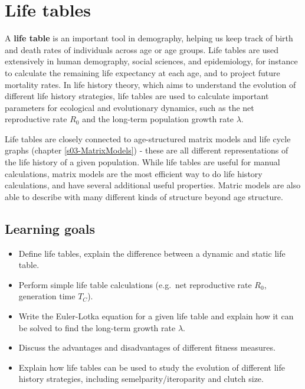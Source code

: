 \documentclass[
]{book}
\begin{document}
\hypertarget{s02-life-tables}{%
\chapter{Life tables}\label{s02-life-tables}}

A \textbf{life table} is an important tool in demography, helping us keep track of birth and death rates of individuals across age or age groups. Life tables are used extensively in human demography, social sciences, and epidemiology, for instance to calculate the remaining life expectancy at each age, and to project future mortality rates. In life history theory, which aims to understand the evolution of different life history strategies, life tables are used to calculate important parameters for ecological and evolutionary dynamics, such as the net reproductive rate \(R_0\) and the long-term population growth rate \(\lambda\).

Life tables are closely connected to age-structured matrix models and life cycle graphs (chapter \ref{s03-MatrixModels}) - these are all different representations of the life history of a given population. While life tables are useful for manual calculations, matrix models are the most efficient way to do life history calculations, and have several additional useful properties. Matric models are also able to describe with many different kinds of structure beyond age structure.

\hypertarget{learning-goals-1}{%
\section{Learning goals}\label{learning-goals-1}}

\begin{itemize}
\item
  Define life tables, explain the difference between a dynamic and static life table.
\item
  Perform simple life table calculations (e.g.~net reproductive rate \(R_0\), generation time \(T_C\)).
\item
  Write the Euler-Lotka equation for a given life table and explain how it can be solved to find the long-term growth rate \(\lambda\).
\item
  Discuss the advantages and disadvantages of different fitness measures.
\item
  Explain how life tables can be used to study the evolution of different life history strategies, including semelparity/iteroparity and clutch size.
\end{itemize}
\end{document}
